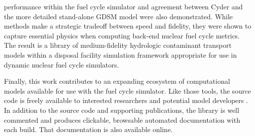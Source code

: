 \Cyder performance within the \Cyclus fuel cycle simulator and agreement
between Cyder and the more detailed stand-alone \gls{GDSM} model were also demonstrated.
While \Cyder methods make a strategic tradeoff between speed and fidelity, they were shown to capture
essential physics when computing back-end nuclear fuel cycle metrics. The
result is a library of medium-fidelity hydrologic contaminant transport models
within a disposal facility simulation framework appropriate for use in dynamic
nuclear fuel cycle simulators.

Finally, this work contributes to an expanding ecosystem of computational
models available for use with the \Cyclus fuel cycle simulator. 
Like those tools, the \Cyder source code is freely available to interested researchers and
potential model developers \cite{huff_cyder_2013}.  In addition to the source
code and supporting publications, the \Cyder library is well commented and
produces clickable, browsable automated documentation with each build. That
documentation is also available online. 


